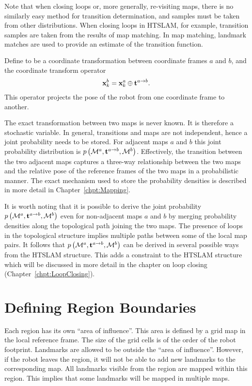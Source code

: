 Note that when closing loops or, more generally, re-visiting maps,
there is no similarly easy method for transition determination, and samples
must be taken from other distributions. When closing
loops in HTSLAM, for example, transition samples are taken from the results of map
matching. In map matching, landmark matches are used to provide an estimate of
the transition function.

Define  to be a coordinate transformation between
coordinate frames $a$ and $b$, and the coordinate transform operator
\transit\ 
$$
\x{k}{}{b} = \x{k}{}{a} \transit \tr{}{a}{b}.
$$
This operator projects the pose of the robot from one coordinate frame to
another.

The exact transformation between two maps is never known. It is
therefore a stochastic variable. In general, transitions and maps are
not independent, hence a joint probability needs to be stored. For
adjacent maps $a$ and $b$ this joint probability distribution is
$\prob{\map{}{}{a},\tr{}{a}{b}, \map{}{}{b}}$. Effectively,
the transition between the two adjacent maps captures a three-way
relationship between the two maps and the relative pose of the
reference frames of the two maps in a probabilistic manner. The exact
mechanism used to store the probability densities is described in more
detail in Chapter~\ref{chpt:Mapping}.

It is worth noting that it is possible to derive the joint probability
$\prob{\map{}{}{a},\tr{}{a}{b},\map{}{}{b}}$ even for non-adjacent
maps $a$ and $b$ by merging probability densities along the
topological path joining the two maps.  The presence of loops in the
topological structure implies multiple paths between some of the local
map pairs. It follows that
$\prob{\map{}{}{a},\tr{}{a}{b},\map{}{}{b}}$ can be derived in several
possible ways from the HTSLAM structure. This adds a constraint to the
HTSLAM structure which will be discussed in more detail in the chapter
on loop closing (Chapter~\ref{chpt:LoopClosing}).




\section{Defining Region Boundaries}
\label{sec:region}

Each region has its own ``area of influence''. This area is defined by
a grid map in the local reference frame. The size of the grid cells is
of the order of the robot footprint. Landmarks are allowed to be
outside the ``area of influence''. However, if the robot leaves the
region, it will not be able to add new landmarks to the corresponding
map. All landmarks visible from the region are mapped within
this region. This implies that some landmarks will be mapped in
multiple maps.

